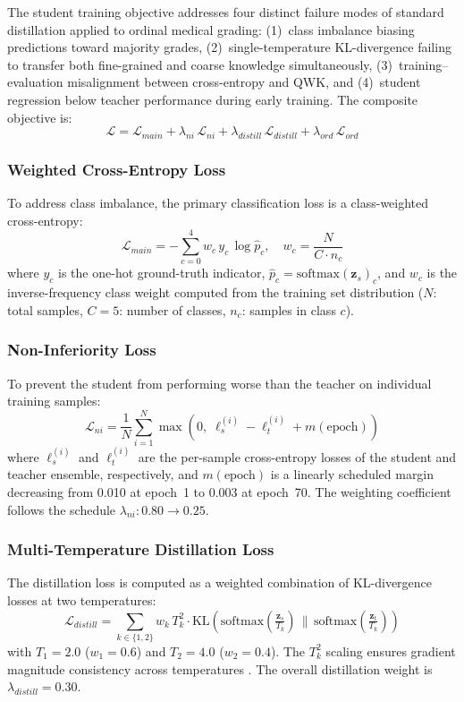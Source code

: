 \documentclass[a4paper,fleqn]{cas-dc}
\begin{document}
The student training objective addresses four distinct failure modes of standard distillation applied to ordinal medical grading: (1)~class imbalance biasing predictions toward majority grades, (2)~single-temperature KL-divergence failing to transfer both fine-grained and coarse knowledge simultaneously, (3)~training--evaluation misalignment between cross-entropy and QWK, and (4)~student regression below teacher performance during early training. The composite objective is:
\begin{equation}
  \mathcal{L} = \mathcal{L}_{main} + \lambda_{ni}\,\mathcal{L}_{ni} +
  \lambda_{distill}\,\mathcal{L}_{distill} + \lambda_{ord}\,\mathcal{L}_{ord}
\end{equation}

\subsubsection{Weighted Cross-Entropy Loss}
To address class imbalance, the primary classification loss is a class-weighted cross-entropy:
\begin{equation}
  \mathcal{L}_{main} = -\sum_{c=0}^{4} w_c\, y_c\, \log\hat{p}_c, \quad
  w_c = \frac{N}{C \cdot n_c}
\end{equation}
where $y_c$ is the one-hot ground-truth indicator, $\hat{p}_c = \text{softmax}(\mathbf{z}_s)_c$, and $w_c$ is the inverse-frequency class weight computed from the training set distribution ($N$: total samples, $C{=}5$: number of classes, $n_c$: samples in class $c$).

\subsubsection{Non-Inferiority Loss}
To prevent the student from performing worse than the teacher on individual training samples:
\begin{equation}
  \mathcal{L}_{ni} = \frac{1}{N}\sum_{i=1}^{N}
  \max\!\left(0,\; \ell_s^{(i)} - \ell_t^{(i)} + m(\text{epoch})\right)
\end{equation}
where $\ell_s^{(i)}$ and $\ell_t^{(i)}$ are the per-sample cross-entropy losses of the student and teacher ensemble, respectively, and $m(\text{epoch})$ is a linearly scheduled margin decreasing from 0.010 at epoch~1 to 0.003 at epoch~70. The weighting coefficient follows the schedule $\lambda_{ni}: 0.80 \to 0.25$.

\subsubsection{Multi-Temperature Distillation Loss}
The distillation loss is computed as a weighted combination of KL-divergence losses at two temperatures:
\begin{equation}
  \mathcal{L}_{distill} = \sum_{k \in \{1,2\}} w_k\, T_k^2 \cdot
  \text{KL}\!\left(\text{softmax}\!\left(\tfrac{\mathbf{z}_s}{T_k}\right) \,\Big\|\,
  \text{softmax}\!\left(\tfrac{\mathbf{z}_t}{T_k}\right)\right)
\end{equation}
with $T_1{=}2.0$ ($w_1{=}0.6$) and $T_2{=}4.0$ ($w_2{=}0.4$). The $T_k^2$ scaling ensures gradient magnitude consistency across temperatures \cite{hinton2015}. The overall distillation weight is $\lambda_{distill} = 0.30$.
\end{document}
